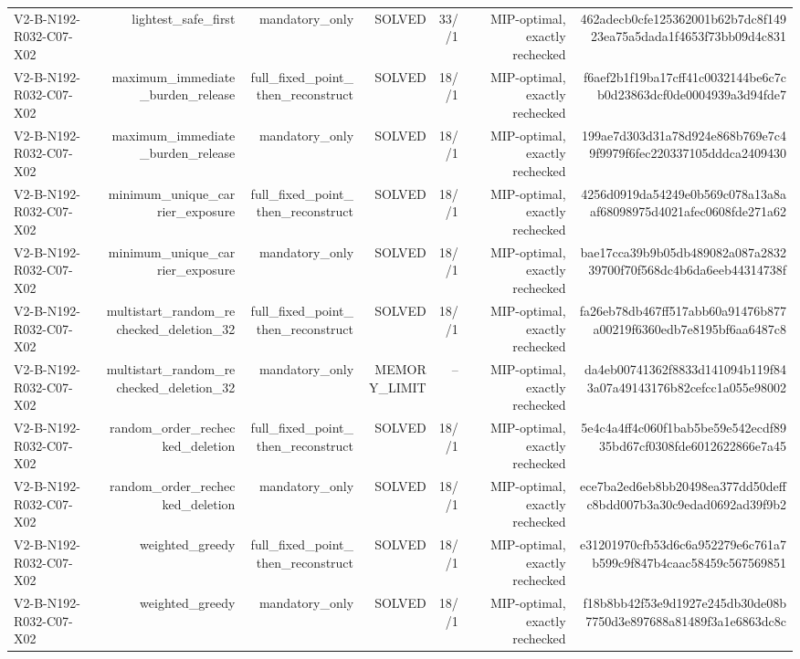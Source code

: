 {\begin{longtable}{lrrrrrr}
V2-B-N192-R032-C07-X02 & lightest\_safe\_first & mandatory\_only & SOLVED & 33//1 & MIP-optimal, exactly rechecked & 462adecb0cfe125362001b62b7dc8f14923ea75a5dada1f4653f73bb09d4c831 \\
V2-B-N192-R032-C07-X02 & maximum\_immediate\_burden\_release & full\_fixed\_point\_then\_reconstruct & SOLVED & 18//1 & MIP-optimal, exactly rechecked & f6aef2b1f19ba17cff41c0032144be6c7cb0d23863dcf0de0004939a3d94fde7 \\
V2-B-N192-R032-C07-X02 & maximum\_immediate\_burden\_release & mandatory\_only & SOLVED & 18//1 & MIP-optimal, exactly rechecked & 199ae7d303d31a78d924e868b769e7c49f9979f6fec220337105dddca2409430 \\
V2-B-N192-R032-C07-X02 & minimum\_unique\_carrier\_exposure & full\_fixed\_point\_then\_reconstruct & SOLVED & 18//1 & MIP-optimal, exactly rechecked & 4256d0919da54249e0b569c078a13a8aaf68098975d4021afec0608fde271a62 \\
V2-B-N192-R032-C07-X02 & minimum\_unique\_carrier\_exposure & mandatory\_only & SOLVED & 18//1 & MIP-optimal, exactly rechecked & bae17cca39b9b05db489082a087a283239700f70f568dc4b6da6eeb44314738f \\
V2-B-N192-R032-C07-X02 & multistart\_random\_rechecked\_deletion\_32 & full\_fixed\_point\_then\_reconstruct & SOLVED & 18//1 & MIP-optimal, exactly rechecked & fa26eb78db467ff517abb60a91476b877a00219f6360edb7e8195bf6aa6487c8 \\
V2-B-N192-R032-C07-X02 & multistart\_random\_rechecked\_deletion\_32 & mandatory\_only & MEMORY\_LIMIT & -- & MIP-optimal, exactly rechecked & da4eb00741362f8833d141094b119f843a07a49143176b82cefcc1a055e98002 \\
V2-B-N192-R032-C07-X02 & random\_order\_rechecked\_deletion & full\_fixed\_point\_then\_reconstruct & SOLVED & 18//1 & MIP-optimal, exactly rechecked & 5e4c4a4ff4c060f1bab5be59e542ecdf8935bd67cf0308fde6012622866e7a45 \\
V2-B-N192-R032-C07-X02 & random\_order\_rechecked\_deletion & mandatory\_only & SOLVED & 18//1 & MIP-optimal, exactly rechecked & ece7ba2ed6eb8bb20498ea377dd50deffc8bdd007b3a30c9edad0692ad39f9b2 \\
V2-B-N192-R032-C07-X02 & weighted\_greedy & full\_fixed\_point\_then\_reconstruct & SOLVED & 18//1 & MIP-optimal, exactly rechecked & e31201970cfb53d6c6a952279e6c761a7b599c9f847b4caac58459c567569851 \\
V2-B-N192-R032-C07-X02 & weighted\_greedy & mandatory\_only & SOLVED & 18//1 & MIP-optimal, exactly rechecked & f18b8bb42f53e9d1927e245db30de08b7750d3e897688a81489f3a1e6863dc8c \\

\end{longtable}}
